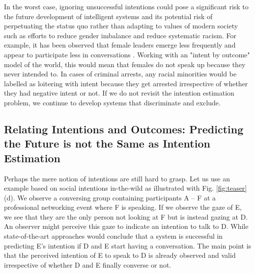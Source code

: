 \documentclass[sigconf]{acmart}
\begin{document}
In the worst case, ignoring unsuccessful intentions could pose a significant risk to the future development of intelligent systems and its potential risk of perpetuating the status quo rather than adapting to values of modern society such as efforts to reduce gender imbalance and reduce systematic racism. For example, it has been observed that female leaders emerge less frequently and appear to participate less in conversations \cite{badura2018gender,GERPOTT2018523,36a5eb2317d14d3aab58408b897ff673}. Working with an "intent by outcome" model of the world, this would mean that females do not speak up because they never intended to. In cases of criminal arrests, any racial minorities would be labelled as loitering with intent because they get arrested irrespective of whether they had negative intent or not. If we do not revisit the intention estimation problem, we continue to develop systems that discriminate and exclude.

\subsection{Relating Intentions and Outcomes: Predicting the Future is not the Same as Intention Estimation}

Perhaps the mere notion of intentions are still hard to grasp. Let us use an example based on  social intentions in-the-wild as illustrated with Fig. \ref{fig:teaser}(d). We observe a conversing group containing participants A -- F at a professional networking event where F is speaking.  If we observe the gaze of E, we see that they are the only person not looking at F but is instead gazing at D. An observer might perceive this gaze to indicate an intention to talk to D. While state-of-the-art approaches would conclude that a system is successful in predicting E's intention if D and E start having a conversation. The main point is that the perceived intention of E to speak to D is already observed and valid irrespective of whether D and E finally converse or not. 
\end{document}
